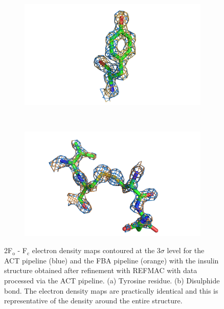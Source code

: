 \begin{figure}
	\centering
    \begin{subfigure}[b]{1.0\textwidth}
        \centering
        \includegraphics[width=\textwidth]{figures/datared/tyrosine_insulin.png}
        \caption{}
        \label{fig:Tyrosine residue - insulin}
    \end{subfigure}
    \\
	\begin{subfigure}[b]{1.0\textwidth}
        \centering
        \includegraphics[width=\textwidth]{figures/datared/disulphide_insulin.png}
        \caption{}
        \label{fig:Disulpide bond - insulin}
    \end{subfigure}
    \caption{2F$_{\text{o}}$ - F$_{\text{c}}$ electron density maps contoured at the 3$\sigma$ level for the ACT pipeline (blue) and the FBA pipeline (orange) with the insulin structure obtained after refinement with REFMAC with data processed via the ACT pipeline.
    (a) Tyrosine residue.
    (b) Disulphide bond.
    The electron density maps are practically identical and this is representative of the density around the entire structure.}
    \label{fig:Electron density maps - insulin}
\end{figure}

